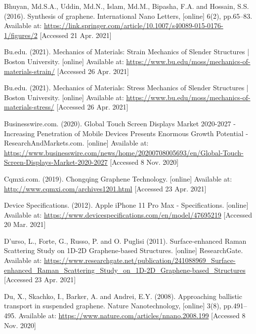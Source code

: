 \documentclass[a4paper,12pt]{article}
\numberwithin{equation}{section}
\numberwithin{figure}{section}
\begin{document}
\noindent Bhuyan, Md.S.A., Uddin, Md.N., Islam, Md.M., Bipasha, F.A. and Hossain, S.S. (2016). Synthesis of graphene. International Nano Letters, [online] 6(2), pp.65–83. Available at: \url{https://link.springer.com/article/10.1007/s40089-015-0176-1/figures/2} [Accessed 21 Apr. 2021]\vspace{\baselineskip}

\noindent Bu.edu. (2021). Mechanics of Materials: Strain Mechanics of Slender Structures | Boston University. [online] Available at: \url{https://www.bu.edu/moss/mechanics-of-materials-strain/} [Accessed 26 Apr. 2021]\vspace{\baselineskip}

\noindent Bu.edu. (2021). Mechanics of Materials: Stress Mechanics of Slender Structures | Boston University. [online] Available at: \url{https://www.bu.edu/moss/mechanics-of-materials-stress/} [Accessed 26 Apr. 2021]\vspace{\baselineskip}

\noindent Businesswire.com. (2020). Global Touch Screen Displays Market 2020-2027 - Increasing Penetration of Mobile Devices Presents Enormous Growth Potential - ResearchAndMarkets.com. [online] Available at: \url{https://www.businesswire.com/news/home/20200708005693/en/Global-Touch-Screen-Displays-Market-2020-2027} [Accessed 8 Nov. 2020]\vspace{\baselineskip}

\noindent Cqmxi.com. (2019). Chongqing Graphene Technology. [online] Available at: \url{http://www.cqmxi.com/archives1201.html} [Accessed 23 Apr. 2021]\vspace{\baselineskip}

\noindent Device Specifications. (2012). Apple iPhone 11 Pro Max - Specifications. [online] Available at: \url{https://www.devicespecifications.com/en/model/47695219} [Accessed 20 Mar. 2021]\vspace{\baselineskip}

\noindent D’urso, L., Forte, G., Russo, P. and O. Puglisi (2011). Surface-enhanced Raman Scattering Study on 1D-2D Graphene-based Structures. [online] ResearchGate. Available at: \url{https://www.researchgate.net/publication/241088969_Surface-enhanced_Raman_Scattering_Study_on_1D-2D_Graphene-based_Structures} [Accessed 23 Apr. 2021]\vspace{\baselineskip}

\noindent Du, X., Skachko, I., Barker, A. and Andrei, E.Y. (2008). Approaching ballistic transport in suspended graphene. Nature Nanotechnology, [online] 3(8), pp.491–495. Available at: \url{https://www.nature.com/articles/nnano.2008.199} [Accessed 8 Nov. 2020]\vspace{\baselineskip} 
\end{document}
